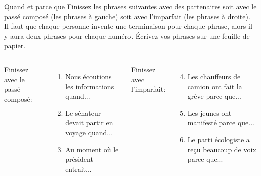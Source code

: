 \begin{frame}{Quand et parce que}
  Finissez les phrases suivantes avec des partenaires soit avec le passé composé (les phrases à gauche) soit avec l'imparfait (les phrases à droite).
  Il faut que chaque personne invente une terminaison pour chaque phrase, alors il y aura \alert{deux} phrases pour chaque numéro.
  Écrivez vos phrases sur une feuille de papier.
  \vspace{0.25cm}
  \begin{columns}
      Finissez avec le passé composé:
      \begin{enumerate}
        \item Nous écoutions les informations quand...
        \item Le sénateur devait partir en voyage quand...
        \item Au moment où le président entrait...
      \end{enumerate}
      Finissez avec l'imparfait:
      \begin{enumerate}
        \setcounter{enumi}{3}
        \item Les chauffeurs de camion ont fait la grève parce que...
        \item Les jeunes ont manifesté parce que...
        \item Le parti écologiste a reçu beaucoup de voix parce que...
      \end{enumerate}
  \end{columns}
\end{frame}